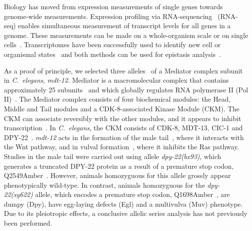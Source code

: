 \documentclass[8pt, twocolumn]{article}
\newcommand{\cel}{\emph{C.~elegans}}
\newcommand{\gene}[1]{\mbox{\emph{#1}}}
\newcommand{\protein}[1]{\mbox{\uppercase{#1}}}
\newcommand{\dpy}{\gene{mdt-12}}
\begin{document}
Biology has moved from expression measurements of single genes towards
genome-wide measurements. Expression profiling via
RNA-sequencing~\cite{Mortazavi2008} (RNA-seq) enables simultaneous measurement
of transcript levels for all genes in a genome. These measurements can be made
on a whole-organism scale or on single cells~\cite{Tang2009,Schwarz2012}.
Transcriptomes have been successfully used to identify new cell or organismal
states~\cite{Angeles-Albores2017,Villani2017} and  both methods can be used for
epistasis analysis~\cite{Dixit2016,AngelesAlboresHIF}.

As a proof of principle, we selected three alleles~\cite{Zhang2000,Moghal2003}
of a Mediator complex subunit in \cel{}, \dpy{}. Mediator is a macromolecular
complex that contains approximately 25 subunits~\cite{Jeronimo2017} and which
globally regulates RNA polymerase II (Pol II)~\cite{Allen2015,Takagi2006}. The
Mediator complex consists of four biochemical modules: the Head, Middle and Tail
modules and a CDK-8-associated Kinase Module (CKM). The CKM can associate
reversibly with the other modules, and it appears to inhibit
transcription~\cite{Knuesel2009,Elmlund2006}. In \cel{}, the CKM consists of
\protein{cdk-8}, \protein{mdt-13}, \protein{cic-1} and
\protein{DPY-22}~\cite{Grants2015}. \dpy{} acts in the formation of the male
tail~\cite{Zhang2000}, where it interacts with the Wnt pathway, and in vulval
formation~\cite{Moghal2003a}, where it inhibits the Ras pathway. Studies in the
male tail were carried out using allele \gene{dpy-22(bx93)}, which generates a
truncated \protein{dpy-22} protein as a result of a premature stop codon,
Q2549Amber~\cite{Zhang2000}. However, animals homozyguous for this allele
grossly appear phenotypically wild-type. In contrast, animals homozyguous for
the \gene{dpy-22(sy622)} allele, which encodes a premature stop codon,
Q1698Amber~\cite{Moghal2003},
are dumpy (Dpy), have
egg-laying defects (Egl) and a multivulva (Muv) phenotype. Due to its
pleiotropic effects, a conclusive allelic series analysis has not previously
been performed.

\end{document}
